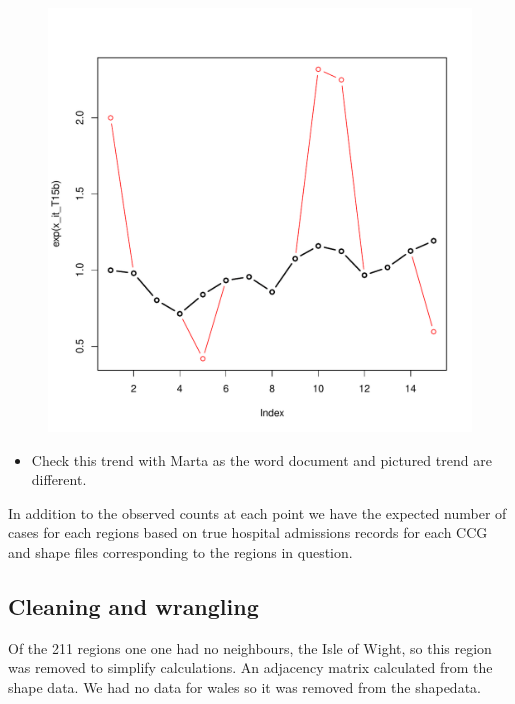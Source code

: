 \documentclass{article}
\begin{document}
\begin{figure}
\includegraphics[scale=0.5]{plot_time_effects}
\centering
\end{figure}

\begin{itemize}
\item Check this trend with Marta as the word document and pictured trend are different.
\end{itemize}

In addition to the observed counts at each point we have the expected number of cases for each regions based on true hospital admissions records for each CCG and shape files corresponding to the regions in question.

\subsection{Cleaning and wrangling}

Of the 211 regions one one had no neighbours, the Isle of Wight, so this region was removed to simplify calculations. An adjacency matrix calculated from the shape data. We had no data for wales so it was removed from the shapedata.
\end{document}
